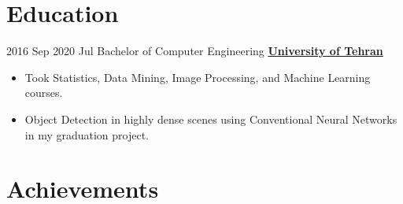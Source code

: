 \documentclass[letterpaper]{DS_class_file} %
\begin{document}
\section{Education}

\begin{twenty} %

   	\twentyitem
	    {2016 Sep}
	    {2020 Jul}
	    {\hspace{0.2cm}Bachelor of Computer Engineering}
	    {\href{https://ut.ac.ir/en}{\hspace{0.27cm} \textbf{University of Tehran} }}
	    {}
	    {\begin{itemize}
			\item Took Statistics, Data Mining, Image Processing, and Machine Learning courses.
			\item Object Detection in highly dense scenes using Conventional Neural Networks in my graduation project.

		\end{itemize}} 
\end{twenty}



\section{Achievements}
\end{document}
